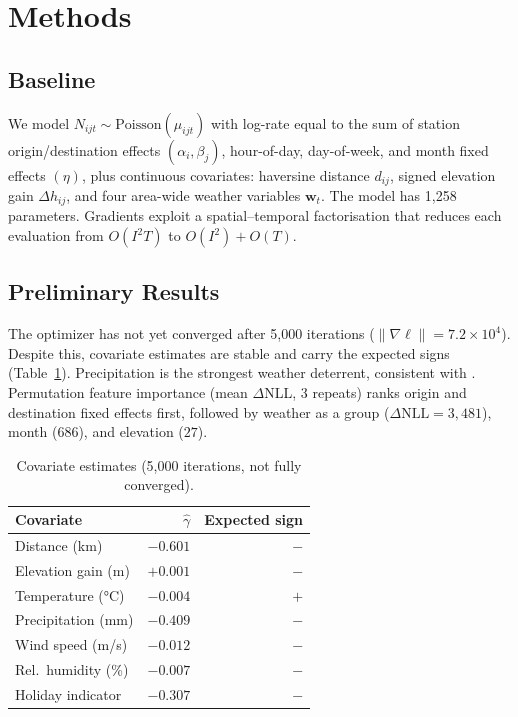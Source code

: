 \documentclass[twoside,11pt]{article}
\begin{document}
\section{Methods}

\subsection{Baseline}

We model $N_{ijt}\sim\text{Poisson}(\mu_{ijt})$ \citep{Flowerdew1982} with log-rate equal to the sum of station origin/destination effects $(\alpha_i,\beta_j)$, hour-of-day, day-of-week, and month fixed effects $(\eta)$, plus continuous covariates: haversine distance $d_{ij}$, signed elevation gain $\Delta h_{ij}$, and four area-wide weather variables $\mathbf{w}_t$. The model has 1{,}258 parameters. Gradients exploit a spatial--temporal factorisation that reduces each evaluation from $O(I^2 T)$ to $O(I^2)+O(T)$.

\subsection{Preliminary Results}

The optimizer has not yet converged after 5{,}000 iterations ($\|\nabla\ell\|=7.2\times10^4$). Despite this, covariate estimates are stable and carry the expected signs (Table~\ref{tab:coef}). Precipitation is the strongest weather deterrent, consistent with \citet{Gebhart2014}. Permutation feature importance (mean $\Delta$NLL, 3 repeats) ranks origin and destination fixed effects first, followed by weather as a group ($\Delta\text{NLL}=3{,}481$), month ($686$), and elevation ($27$).

\begin{table}[h]
\centering
\caption{Covariate estimates (5{,}000 iterations, not fully converged).}
\label{tab:coef}
\smallskip
\begin{tabular}{lrr}
\toprule
Covariate & $\hat\gamma$ & Expected sign \\
\midrule
Distance (km)       & $-0.601$ & $-$ \\
Elevation gain (m)  & $+0.001$ & $-$ \\
Temperature (°C)    & $-0.004$ & $+$ \\
Precipitation (mm)  & $-0.409$ & $-$ \\
Wind speed (m/s)    & $-0.012$ & $-$ \\
Rel.\ humidity (\%) & $-0.007$ & $-$ \\
Holiday indicator   & $-0.307$ & $-$ \\
\bottomrule
\end{tabular}
\end{table}
\end{document}
